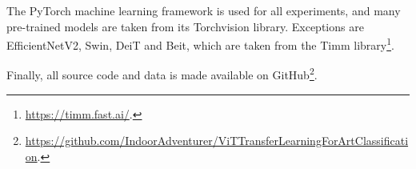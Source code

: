 The PyTorch machine learning framework is used for all experiments, and many pre-trained models are taken from its Torchvision library. Exceptions are EfficientNetV2, Swin, DeiT and Beit, which are taken from the Timm library\footnote{\url{https://timm.fast.ai/}.}.

Finally, all source code and data is made available on GitHub\footnote{\url{https://github.com/IndoorAdventurer/ViTTransferLearningForArtClassification}.}.

